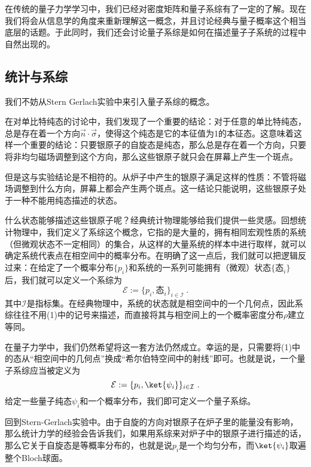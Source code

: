 


在传统的量子力学学习中，我们已经对密度矩阵和量子系综有了一定的了解。现在我们将会从信息学的角度来重新理解这一概念，并且讨论经典与量子概率这个相当底层的话题。于此同时，我们还会讨论量子系综是如何在描述量子子系统的过程中自然出现的。

\subsection{统计与系综}

我们不妨从Stern Gerlach实验中来引入量子系综的概念。

在对单比特纯态的讨论中，我们发现了一个重要的结论：对于任意的单比特纯态，总是存在着一个方向$\vec{n}\cdot\vec{\sigma}$，使得这个纯态是它的本征值为1的本征态。这意味着这样一个重要的结论：只要银原子的自旋态是纯态，那么总是存在着一个方向，只要将非均匀磁场调整到这个方向，那么这些银原子就只会在屏幕上产生一个斑点。

但是这与实验结论是不相符的。从炉子中产生的银原子满足这样的性质：不管将磁场调整到什么方向，屏幕上都会产生两个斑点。这一结论只能说明，这些银原子处于一种不能用纯态描述的状态。

什么状态能够描述这些银原子呢？经典统计物理能够给我们提供一些灵感。回想统计物理中，我们定义了系综这个概念，它指的是大量的，拥有相同宏观性质的系统（但微观状态不一定相同）的集合，从这样的大量系统的样本中进行取样，就可以确定系统代表点在相空间中的概率分布。在明确了这一点后，我们就可以把逻辑反过来：在给定了一个概率分布$\{p_i\}$和系统的一系列可能拥有（微观）状态$\{\text{态}_i\}$后，我们就可以定义一个系综为
\begin{equation}
\mathcal{E}:=\{p_i, \text{态}_i\}_{i\in\mathcal{I}}~.
\end{equation}
其中$\mathcal{I}$是指标集。在经典物理中，系统的状态就是相空间中的一个几何点，因此系综往往不用(1)中的记号来描述，而直接将其与相空间上的一个概率密度分布$\rho$建立等同。

在量子力学中，我们仍然希望将这一套方法仍然成立。幸运的是，只需要将(1)中的态从“相空间中的几何点”换成“希尔伯特空间中的射线”即可。也就是说，一个量子系综应当被定义为
\begin{equation}
\mathcal{E}:=\{p_i,\ket{\psi_i}\}_{i\in\mathcal{I}}~.
\end{equation}
给定一些量子纯态$\psi_i$和一个概率分布，我们即可定义一个量子系综。

回到Stern-Gerlach实验中。由于自旋的方向对银原子在炉子里的能量没有影响，那么统计力学的经验会告诉我们，如果用系综来对炉子中的银原子进行描述的话，那么它关于自旋态是等概率分布的，也就是说$p_i$是一个均匀分布，而$\ket{\psi_i}$取遍整个Bloch球面。

